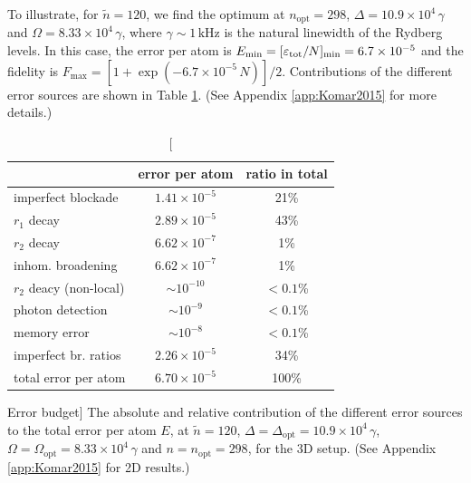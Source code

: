 To illustrate, for $\tilde n = 120$, we find the optimum at $n_\mathrm{opt} =
298$, $\Delta = 10.9\times 10^4 \,\gamma$ and $\Omega = 8.33\times
10^4\,\gamma$, where $\gamma \sim 1\,\mathrm{kHz}$ is the natural linewidth of the
Rydberg levels. In this case, the error per atom is $E_\mathrm{min}=
[\varepsilon_\mathrm{tot}/N]_\mathrm{min} = 6.7\times 10^{-5}$ and the fidelity is
$F_\mathrm{max} = [1 + \exp(-6.7\times 10^{-5}\,N)]/2$.
Contributions of the different error sources are shown in Table
\ref{table:errors}. (See Appendix \ref{app:Komar2015} for more details.)
\begin{table}
\centering
\begin{tabular}{|l|c|c|}
\hline
 & error per atom & ratio in total\\
\hline
imperfect blockade & $1.41 \times 10^{-5}$ & 21\%\\
$r_1$ decay & $2.89 \times 10^{-5}$ & 43\%\\
$r_2$ decay & $6.62 \times 10^{-7}$ & 1\%\\
inhom. broadening & $6.62 \times 10^{-7}$ & 1\%\\
$r_2$ deacy (non-local) & $ \sim 10^{-10}$ & $<0.1$\%\\
photon detection & $ \sim 10^{-9}$ & $<0.1$\%\\
memory error & $ \sim 10^{-8}$ & $<0.1$\%\\
imperfect br. ratios & $2.26 \times 10^{-5}$ & 34\%\\
\hline
total error per atom & $6.70 \times 10^{-5}$ & 100\%\\
\hline
\end{tabular}
\caption
[Error budget]{
\label{table:errors}
The absolute and relative contribution of the different error sources to the
total error per atom $E$, at $\tilde n = 120$, $\Delta =
\Delta_\mathrm{opt} = 10.9\times 10^4\,\gamma$, $\Omega = \Omega_\mathrm{opt} = 
8.33\times 10^4\,\gamma$ and $n = n_\mathrm{opt} = 298$, for the 3D setup. (See
Appendix \ref{app:Komar2015} for 2D results.)}
\end{table}

